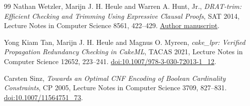 \documentclass[11pt]{article}
\theoremstyle{remark}
\begin{document}
\begin{thebibliography}{99}
Nathan Wetzler, Marijn J. H. Heule and Warren A. Hunt, Jr.,
\emph{DRAT-trim: Efficient Checking and Trimming Using Expressive
Clausal Proofs}, SAT 2014, Lecture Notes in Computer Science 8561,
422--429.
\href{https://www.cs.cmu.edu/~mheule/publications/drat-trim.pdf}{Author manuscript}.

Yong Kiam Tan, Marijn J. H. Heule and Magnus O. Myreen,
\emph{cake\_lpr: Verified Propagation Redundancy Checking in CakeML},
TACAS 2021, Lecture Notes in Computer Science 12652, 223--241.
\href{https://doi.org/10.1007/978-3-030-72013-1_12}{doi:10.1007/978-3-030-72013-1\_12}.

Carsten Sinz, \emph{Towards an Optimal CNF Encoding of Boolean
Cardinality Constraints}, CP 2005, Lecture Notes in Computer Science
3709, 827--831.
\href{https://doi.org/10.1007/11564751_73}{doi:10.1007/11564751\_73}.
\end{thebibliography}
\end{document}
